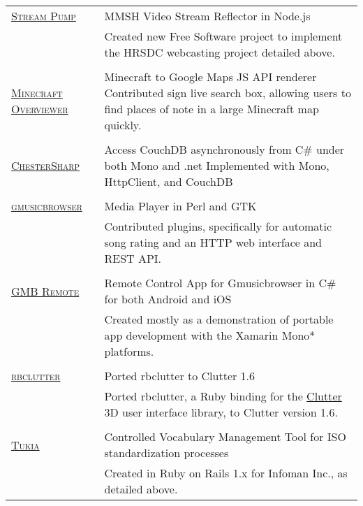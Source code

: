 \documentclass[letterpaper,10pt]{article}
\begin{document}
\begin{longtable}{p{3cm}|p{12cm}}
  \textsc{\href{https://github.com/orospakr/stream-pump}{Stream Pump}} & MMSH Video Stream Reflector in Node.js \\
   & \footnotesize{Created new Free Software project to implement the HRSDC webcasting project detailed above.} \\
  \multicolumn{2}{c}{} \\
  \textsc{\href{https://github.com/brownan/Minecraft-Overviewer}{Minecraft Overviewer}} & Minecraft to Google Maps JS API renderer \newline \footnotesize{Contributed sign live search box, allowing users to find places of note in a large Minecraft map quickly.} \\
  \multicolumn{2}{c}{} \\
  \textsc{\href{https://github.com/orospakr/ChesterSharp}{ChesterSharp}} & Access CouchDB asynchronously from C\# under both Mono and .net \newline \footnotesize{Implemented with Mono, HttpClient, and CouchDB} \\
  \multicolumn{2}{c}{} \\
  \textsc{\href{http://www.gmusicbrowser.org}{gmusicbrowser}} & Media Player in Perl and GTK \\
   & \footnotesize{Contributed plugins, specifically for automatic song rating and an HTTP web interface and REST API.} \\
  \multicolumn{2}{c}{} \\
  \textsc{\href{https://github.com/orospakr/gmusicbrowser-remote}{GMB Remote}} & Remote Control App for Gmusicbrowser in C\# for both Android and iOS \\
   & \footnotesize{Created mostly as a demonstration of portable app development with the Xamarin Mono* platforms.} \\
  \multicolumn{2}{c}{} \\
  \textsc{\href{https://github.com/orospakr/rbclutter}{rbclutter}} & Ported rbclutter to Clutter 1.6 \\
   & \footnotesize{Ported rbclutter, a Ruby binding for the \href{https://live.gnome.org/Clutter}{Clutter} 3D user interface library, to Clutter version 1.6.} \\
  \multicolumn{2}{c}{} \\
  \textsc{\href{https://github.com/orospakr/tukia}{Tukia}} & Controlled Vocabulary Management Tool for ISO standardization processes \\
   & \footnotesize{Created in Ruby on Rails 1.x for Infoman Inc., as detailed above.} \\

\end{longtable}
\end{document}
